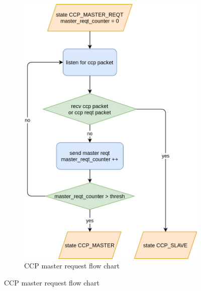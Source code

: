 \documentclass[\main/main.tex]{subfiles}
\begin{document}

\begin{figure}
    \centering
    \begin{subfigure}[b]{0.47\textwidth}
        \begin{center}
            \includegraphics[scale=0.3]{ccp_master_reqt_flow_chart.png}
        \end{center}
        \caption{CCP master request flow chart}
        \label{fig:ccp_master_reqt_flow_chart}

\end{subfigure}
\end{figure}
\end{document}
